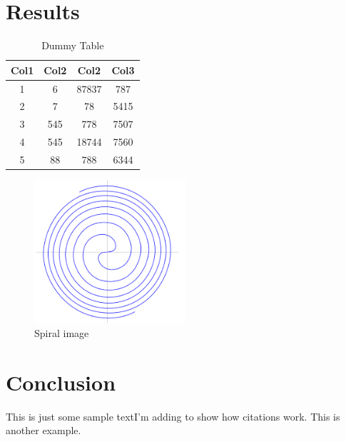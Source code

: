 \documentclass{seminarreport}
\begin{document}
	\section{Results}
		\lipsum[8]
	\begin{table}[h!]
		\centering
		\begin{tabular}{||c c c c||} 
			\hline
			Col1 & Col2 & Col2 & Col3 \\ [0.5ex] 
			\hline\hline
			1 & 6 & 87837 & 787 \\ 
			2 & 7 & 78 & 5415 \\
			3 & 545 & 778 & 7507 \\
			4 & 545 & 18744 & 7560 \\
			5 & 88 & 788 & 6344 \\ [1ex] 
			\hline
		\end{tabular}
		\caption{Dummy Table}
		\label{table:1}
	\end{table}
	\begin{figure}[h]
		\caption{Spiral image}
		\centering
		\includegraphics[width=0.5\textwidth]{images/spiral}
	\end{figure}

	\section{Conclusion}
	This is just some sample textI'm adding to show how citations\cite{einstein} work. This \cite{latexcompanion} is another example.
	\newpage
	 
	
\end{document}
